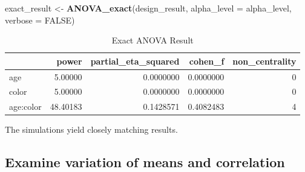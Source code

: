 \documentclass[]{book}
\newenvironment{Shaded}{\begin{snugshade}}{\end{snugshade}}
\newcommand{\DataTypeTok}[1]{\textcolor[rgb]{0.13,0.29,0.53}{#1}}
\newcommand{\KeywordTok}[1]{\textcolor[rgb]{0.13,0.29,0.53}{\textbf{#1}}}
\newcommand{\NormalTok}[1]{#1}
\newcommand{\OtherTok}[1]{\textcolor[rgb]{0.56,0.35,0.01}{#1}}
\newcommand{\StringTok}[1]{\textcolor[rgb]{0.31,0.60,0.02}{#1}}
\begin{document}
\begin{Shaded}
\begin{Highlighting}[]
\NormalTok{exact_result <-}\StringTok{ }\KeywordTok{ANOVA_exact}\NormalTok{(design_result,}
                            \DataTypeTok{alpha_level =}\NormalTok{ alpha_level,}
                            \DataTypeTok{verbose =} \OtherTok{FALSE}\NormalTok{)}
\end{Highlighting}
\end{Shaded}

\begin{table}[!h]

\caption{\label{tab:unnamed-chunk-146}Exact ANOVA Result}
\centering
\begin{tabular}{l|r|r|r|r}
\hline
  & power & partial\_eta\_squared & cohen\_f & non\_centrality\\
\hline
age & 5.00000 & 0.0000000 & 0.0000000 & 0\\
\hline
color & 5.00000 & 0.0000000 & 0.0000000 & 0\\
\hline
age:color & 48.40183 & 0.1428571 & 0.4082483 & 4\\
\hline
\end{tabular}
\end{table}

The simulations yield closely matching results.

\hypertarget{examine-variation-of-means-and-correlation}{%
\subsection{Examine variation of means and correlation}\label{examine-variation-of-means-and-correlation}}
\end{document}
